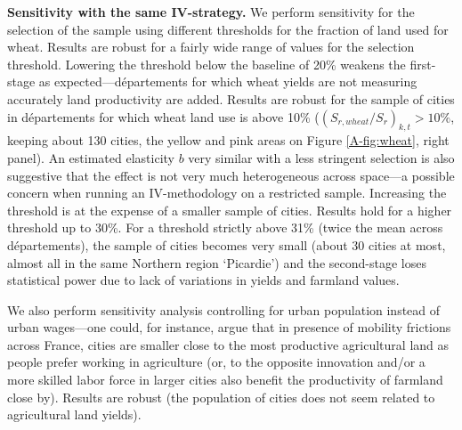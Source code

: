 \documentclass[11pt]{report}
\begin{document}
\noindent \textbf{Sensitivity with the same IV-strategy.} We perform sensitivity for the selection of the sample using different thresholds for the fraction of land used for wheat. Results are robust for a fairly wide range of values for the selection threshold. Lowering the threshold below the baseline of 20\% weakens the first-stage as expected---départements for which wheat yields are not measuring accurately land productivity are added. Results are robust for the sample of cities in départements for which wheat land use is above 10\% ($(S_{r,wheat}/S_r)_{k,t}>10\%$, keeping about 130 cities, the yellow and pink areas on Figure \ref{A-fig:wheat}, right panel). An estimated elasticity $b$ very similar with a less stringent selection is also suggestive that the effect is not very much heterogeneous across space---a possible concern when running an IV-methodology on a restricted sample. Increasing the threshold is at the expense of a smaller sample of cities. Results hold for a higher threshold up to 30\%. For a threshold strictly above 31\% (twice the mean across départements), the sample of cities becomes very small (about 30 cities at most, almost all in the same Northern region `Picardie') and the second-stage loses statistical power due to lack of variations in yields and farmland values. 

We also perform sensitivity analysis controlling for urban population instead of urban wages---one could, for instance, argue that in presence of mobility frictions across France, cities are smaller close to the most productive agricultural land as people prefer working in agriculture (or, to the opposite innovation and/or a more skilled labor force in larger cities also benefit the productivity of farmland close by). Results are robust (the population of cities does not seem related to agricultural land yields).

\end{document}
